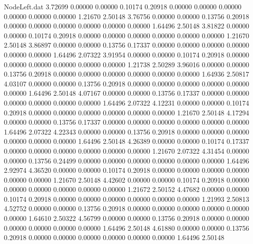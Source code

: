 \begin{filecontents}{NodeLeft.dat}
   3.72699    0.00000    0.00000     0.10174    0.20918    0.00000    0.00000    0.00000    0.00000    0.00000    0.00000    1.21670    2.50148
   3.76756    0.00000    0.00000     0.13756    0.20918    0.00000    0.00000    0.00000    0.00000    0.00000    0.00000    1.64496    2.50148
   3.81822    0.00000    0.00000     0.10174    0.20918    0.00000    0.00000    0.00000    0.00000    0.00000    0.00000    1.21670    2.50148
   3.86897    0.00000    0.00000     0.13756    0.17337    0.00000    0.00000    0.00000    0.00000    0.00000    0.00000    1.64496    2.07322
   3.91954    0.00000    0.00000     0.10174    0.20918    0.00000    0.00000    0.00000    0.00000    0.00000    0.00000    1.21738    2.50289
   3.96016    0.00000    0.00000     0.13756    0.20918    0.00000    0.00000    0.00000    0.00000    0.00000    0.00000    1.64936    2.50817
   4.03107    0.00000    0.00000     0.13756    0.20918    0.00000    0.00000    0.00000    0.00000    0.00000    0.00000    1.64496    2.50148
   4.07167    0.00000    0.00000     0.13756    0.17337    0.00000    0.00000    0.00000    0.00000    0.00000    0.00000    1.64496    2.07322
   4.12231    0.00000    0.00000     0.10174    0.20918    0.00000    0.00000    0.00000    0.00000    0.00000    0.00000    1.21670    2.50148
   4.17294    0.00000    0.00000     0.13756    0.17337    0.00000    0.00000    0.00000    0.00000    0.00000    0.00000    1.64496    2.07322
   4.22343    0.00000    0.00000     0.13756    0.20918    0.00000    0.00000    0.00000    0.00000    0.00000    0.00000    1.64496    2.50148
   4.26389    0.00000    0.00000     0.10174    0.17337    0.00000    0.00000    0.00000    0.00000    0.00000    0.00000    1.21670    2.07322
   4.31454    0.00000    0.00000     0.13756    0.24499    0.00000    0.00000    0.00000    0.00000    0.00000    0.00000    1.64496    2.92974
   4.36520    0.00000    0.00000     0.10174    0.20918    0.00000    0.00000    0.00000    0.00000    0.00000    0.00000    1.21670    2.50148
   4.42602    0.00000    0.00000     0.10174    0.20918    0.00000    0.00000    0.00000    0.00000    0.00000    0.00000    1.21672    2.50152
   4.47682    0.00000    0.00000     0.10174    0.20918    0.00000    0.00000    0.00000    0.00000    0.00000    0.00000    1.21993    2.50813
   4.52752    0.00000    0.00000     0.13756    0.20918    0.00000    0.00000    0.00000    0.00000    0.00000    0.00000    1.64610    2.50322
   4.56799    0.00000    0.00000     0.13756    0.20918    0.00000    0.00000    0.00000    0.00000    0.00000    0.00000    1.64496    2.50148
   4.61880    0.00000    0.00000     0.13756    0.20918    0.00000    0.00000    0.00000    0.00000    0.00000    0.00000    1.64496    2.50148

\end{filecontents}
